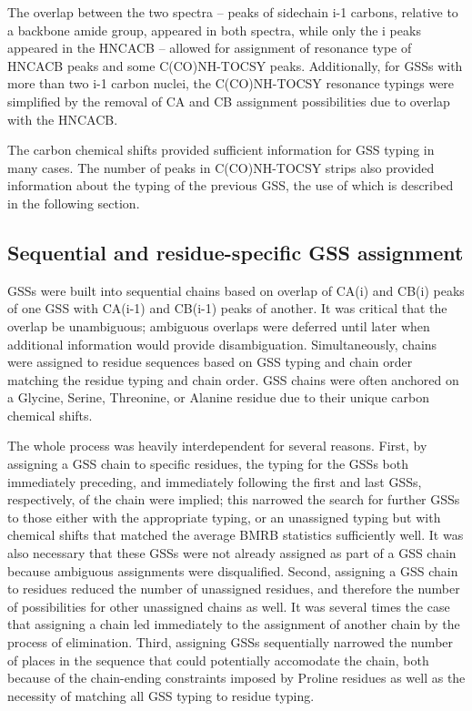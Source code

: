 The overlap between the two spectra -- peaks of sidechain i-1 carbons, relative
to a backbone amide group, appeared in both spectra, while only the i peaks
appeared in the HNCACB -- allowed for assignment of resonance type of HNCACB
peaks and some C(CO)NH-TOCSY peaks.  Additionally, for GSSs with more than two
i-1 carbon nuclei, the C(CO)NH-TOCSY resonance typings were simplified by the
removal of CA and CB assignment possibilities due to overlap with the HNCACB.

The carbon chemical shifts provided sufficient information for GSS typing
in many cases.  The number of peaks in C(CO)NH-TOCSY strips also provided 
information about the typing of the previous GSS, the use of which is described
in the following section.

\subsection*{Sequential and residue-specific GSS assignment}
GSSs were built into sequential chains based on overlap of CA(i) and CB(i) 
peaks of one GSS with CA(i-1) and CB(i-1) peaks of another.  It was critical
that the overlap be unambiguous; ambiguous overlaps were deferred until later
when additional information would provide disambiguation.
Simultaneously, chains were assigned to residue sequences based on GSS typing
and chain order matching the residue typing and chain order.  GSS chains
were often anchored on a Glycine, Serine, Threonine, or Alanine residue due
to their unique carbon chemical shifts.

The whole process was heavily interdependent for several reasons.  First, by
assigning a GSS chain to specific residues, the typing for the GSSs both
immediately preceding, and immediately following the first and last GSSs,
respectively, of the chain were implied; this narrowed the search for further
GSSs to those either with the appropriate typing, or an unassigned typing but
with chemical shifts that matched the average BMRB statistics sufficiently 
well.  It was also necessary that these GSSs were not already assigned as 
part of a GSS chain because ambiguous assignments were disqualified.
Second, assigning a GSS chain to residues reduced the number of unassigned
residues, and therefore the number of possibilities for other unassigned chains
as well.  It was several times the case that assigning a chain led immediately
to the assignment of another chain by the process of elimination.  Third,
assigning GSSs sequentially narrowed the number of places in the sequence that
could potentially accomodate the chain, both because of the chain-ending
constraints imposed by Proline residues as well as the necessity of matching
all GSS typing to residue typing.

